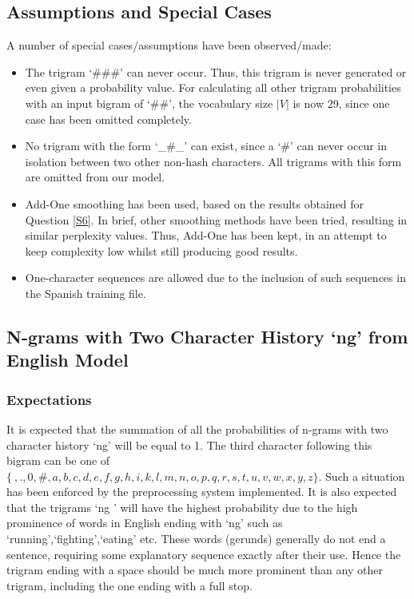 \documentclass[12pt]{article}
\begin{document}
\subsection{Assumptions and Special Cases}\label{assum}
A number of special cases/assumptions have been observed/made:
\begin{itemize}
	\item The trigram `\#\#\#' can never occur.  Thus, this trigram is never generated or even given a probability value.  For calculating all other trigram probabilities with an input bigram of `\#\#', the vocabulary size $|V|$ is now 29, since one case has been omitted completely.
	\item No trigram with the form `\_\#\_' can exist, since a `\#' can never occur in isolation between two other non-hash characters.  All trigrams with this form are omitted from our model.
	\item Add-One smoothing has been used, based on the results obtained for Question \ref{S6}. In brief, other smoothing methods have been tried, resulting in similar perplexity values.  Thus, Add-One has been kept, in an attempt to keep complexity low whilst still producing good results.
	\item  One-character sequences are allowed due to the inclusion of such sequences in the Spanish training file.
\end{itemize}
\subsection{N-grams with Two Character History `ng' from English Model}
\subsubsection{Expectations}
It is expected that the summation of all the probabilities of n-grams with two character history `ng' will be equal to 1. The third character following this bigram can be one of $\{ \ ,.,0,\#,a,b,c,d,e,f,g,h,i,k,l,m,n,o,p,q,r,s,t,u,v,w,x,y,z\}$.  Such a situation has been enforced by the preprocessing system implemented.  It is also expected that the trigrams `ng ' will have the highest probability due to the high prominence of words in English ending with `ng' such as `running',`fighting',`eating' etc.  These words (gerunds) generally do not end a sentence, requiring some explanatory sequence exactly after their use.  Hence the trigram ending with a space should be much more prominent than any other trigram, including the one ending with a full stop.
\end{document}
